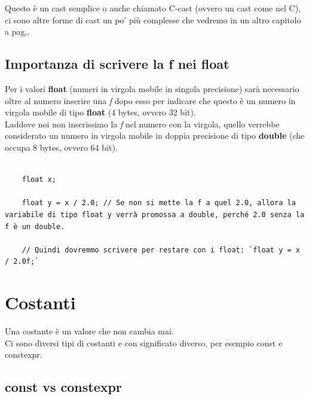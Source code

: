 \textsf{\small Questo è un cast semplice o anche chiamato C-cast (ovvero un cast come nel C), ci sono altre forme di cast un po' più complesse che vedremo in un altro capitolo a pag.\textbf{\pageref{cast_types}}.} \\

\subsection{Importanza di scrivere la f nei float}

\textsf{\small Per i valori \textbf{float} (numeri in virgola mobile in singola precisione) sarà necessario oltre al numero inserire una \emph{f} dopo esso per indicare che questo è un numero in virgola mobile di tipo \textbf{float} (4 bytes, ovvero 32 bit).} \\

\textsf{\small Laddove noi non inserissimo la \emph{f} nel numero con la virgola, quello verrebbe considerato un numero in virgola mobile in doppia precisione di tipo \textbf{double} (che occupa 8 bytes, ovvero 64 bit).} \\

\begin{lstlisting}
	
	float x;
	
	float y = x / 2.0; // Se non si mette la f a quel 2.0, allora la variabile di tipo float y verrà promossa a double, perché 2.0 senza la f è un double.
	
	// Quindi dovremmo scrivere per restare con i float: `float y = x / 2.0f;`
\end{lstlisting}


\newpage

\section{Costanti}

\textsf{\small Una costante è un valore che non cambia mai.}\\

\textsf{\small Ci sono diversi tipi di costanti e con significato diverso, per esempio \color{myblue2} const \normalcolor e \color{myblue2} constexpr. \normalcolor}\\

\subsection{const vs constexpr}

